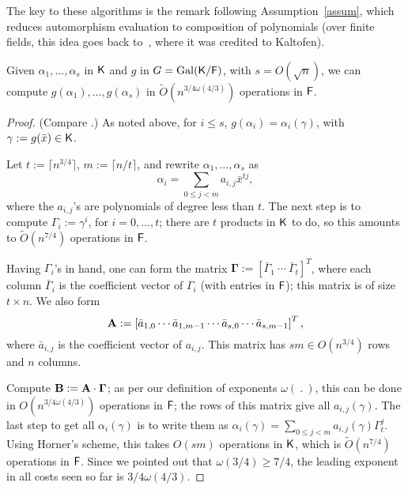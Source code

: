 The key to these algorithms is the remark following
Assumption~\ref{assum}, which reduces automorphism evaluation to
composition of polynomials (over finite fields, this idea goes back
to~\cite{GaSh92}, where it was credited to Kaltofen).

\begin{lemma}\label{lem:modcom}
  Given $\alpha_1,\dots,\alpha_s$ in ${\mathsf{K}}$ and $g$ in $G =
  \mathrm{Gal}({\mathsf{K}}/{\mathsf{F}})$, with $s = O(\sqrt{n})$, we can compute
  $g(\alpha_1),\dots,g(\alpha_s)$ in $\tilde
  O(n^{{3}/{4}\omega({4}/{3})})$ operations in ${\mathsf{F}}$.
\end{lemma}
\begin{proof}
(Compare \cite[Lemma~3]{KalSho98}.) As noted above, for $i\le s$,
  $g(\alpha_i) = \alpha_i(\gamma)$, with $\gamma := g(\bar x) \in {\mathsf{K}}$.

  Let $t := \lceil n^{3/4} \rceil$, $m:=\lceil n/t\rceil$, and rewrite $\alpha_1 , \ldots , \alpha_s$ as 
$$\alpha_i = \sum_{0 \leq j < m} a_{i,j}\bar x^{tj},$$ where the
  $a_{i,j}$'s are polynomials of degree less than $t$. The next step
  is to compute $\Gamma_i := \gamma^i$, for $i = 0 , \ldots , t$;
  there are $t$ products in ${\mathsf{K}}$ to do, so this amounts to
  $\tilde{O}(n^{7/4})$ operations in ${\mathsf{F}}$.

  Having $\Gamma_i$'s in hand, one can form the matrix $\boldsymbol{\Gamma} :=
  \left[ \bar \Gamma_1 ~ \cdots ~\bar \Gamma_t \right]^T$, where each column 
$\bar \Gamma_i$ is
  the coefficient vector of $\Gamma_i$ (with entries in ${\mathsf{F}}$);
  this matrix is of size $t \times n$. We also form
  $$\mat A := \left[\bar{a}_{1,0} \cdots \bar{a}_{1,m-1} \cdots
    \bar{a}_{s,0} \cdots \bar{a}_{s,m-1}\right]^T,$$ where
  $\bar{a}_{i,j}$ is the coefficient vector of $a_{i,j}$. This matrix 
  has $s m \in O(n^{3/4})$ rows and $n$ columns.

  Compute $\mat B:=\mat A \cdot \boldsymbol{\Gamma}$; as per our
  definition of exponents $\omega(\ .\ )$, this can be done in
  $O(n^{3/4 \omega(4/3)})$ operations in ${\mathsf{F}}$; the rows of this matrix
  give all $a_{i,j}(\gamma)$.  The last step to get all
  $\alpha_i(\gamma)$ is to write them as $\alpha_i(\gamma) = \sum_{0
    \leq j < m} a_{i,j}(\gamma) \Gamma_t^{j}.$ Using Horner's scheme,
  this takes $O(sm)$ operations in ${\mathsf{K}}$, which is $\tilde{O}(n^{7/4})$
  operations in ${\mathsf{F}}$. Since we pointed out that $\omega(3/4) \ge 7/4$,
  the leading exponent in all costs seen so far is
  ${3}/{4}\omega({4}/{3})$.
\end{proof}

